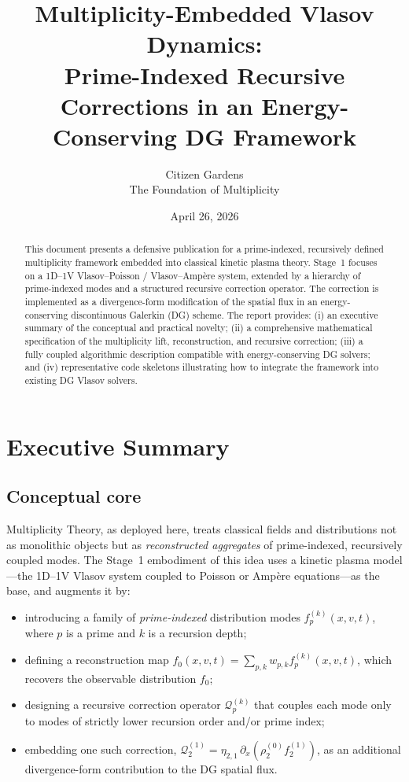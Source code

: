\documentclass[11pt]{article}
\title{Multiplicity-Embedded Vlasov Dynamics: \\
Prime-Indexed Recursive Corrections in an Energy-Conserving DG Framework}
\author{Citizen Gardens \\ The Foundation of Multiplicity}
\date{April 26, 2026}
\begin{document}
\maketitle

\begin{abstract}
This document presents a defensive publication for a prime-indexed, recursively
defined multiplicity framework embedded into classical kinetic plasma theory.
Stage~1 focuses on a 1D--1V Vlasov--Poisson / Vlasov--Amp\`ere system, extended
by a hierarchy of prime-indexed modes and a structured recursive correction
operator. The correction is implemented as a divergence-form modification of
the spatial flux in an energy-conserving discontinuous Galerkin (DG) scheme.
The report provides: (i) an executive summary of the conceptual and practical
novelty; (ii) a comprehensive mathematical specification of the multiplicity
lift, reconstruction, and recursive correction; (iii) a fully coupled
algorithmic description compatible with energy-conserving DG solvers; and (iv)
representative code skeletons illustrating how to integrate the framework into
existing DG Vlasov solvers.
\end{abstract}

\tableofcontents
\newpage
\section{Executive Summary}

\subsection{Conceptual core}

Multiplicity Theory, as deployed here, treats classical fields and
distributions not as monolithic objects but as \emph{reconstructed aggregates}
of prime-indexed, recursively coupled modes. The Stage~1 embodiment of this
idea uses a kinetic plasma model---the 1D--1V Vlasov system coupled to Poisson
or Amp\`ere equations---as the base, and augments it by:
\begin{itemize}
  \item introducing a family of \emph{prime-indexed} distribution modes
        $f_p^{(k)}(x,v,t)$, where $p$ is a prime and $k$ is a recursion depth;
  \item defining a reconstruction map
        \(
          f_0(x,v,t) = \sum_{p,k} w_{p,k} f_p^{(k)}(x,v,t)
        \),
        which recovers the observable distribution $f_0$;
  \item designing a recursive correction operator
        $\mathcal{Q}_p^{(k)}$ that couples each mode only to modes of
        strictly lower recursion order and/or prime index;
  \item embedding one such correction, 
        $\mathcal{Q}_2^{(1)} = \eta_{2,1}\,\partial_x(\rho_2^{(0)} f_2^{(1)})$,
        as an additional divergence-form contribution to the DG spatial flux.
\end{itemize}
\end{document}
